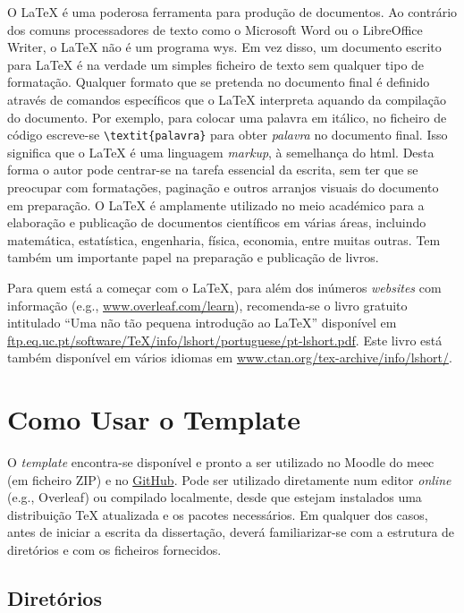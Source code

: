 O \LaTeX{} é uma poderosa ferramenta para produção de documentos. Ao contrário dos comuns processadores de texto como o Microsoft Word ou o LibreOffice Writer, o \LaTeX{} não é um programa \ac{wys}. Em vez disso, um documento escrito para \LaTeX{} é na verdade um simples ficheiro de texto sem qualquer tipo de formatação. Qualquer formato que se pretenda no documento final é definido através de comandos específicos que o \LaTeX{} interpreta aquando da compilação do documento. Por exemplo, para colocar uma palavra em itálico, no ficheiro de código escreve-se \verb|\textit{palavra}| para obter \textit{palavra} no documento final. Isso significa que o \LaTeX{} é uma linguagem \emph{markup}, à semelhança do \ac{html}. Desta forma o autor pode centrar-se na tarefa essencial da escrita, sem ter que se preocupar com formatações, paginação e outros arranjos visuais do documento em preparação. O \LaTeX{} é amplamente utilizado no meio académico para a elaboração e publicação de documentos científicos em várias áreas, incluindo matemática, estatística, engenharia, física, economia, entre muitas outras. Tem também um importante papel na preparação e publicação de livros.

Para quem está a começar com o \LaTeX{}, para além dos inúmeros \textit{websites} com informação (e.g., \url{www.overleaf.com/learn}), recomenda-se o livro gratuito intitulado ``Uma não tão pequena introdução ao \LaTeX{}'' disponível em \url{ftp.eq.uc.pt/software/TeX/info/lshort/portuguese/pt-lshort.pdf}. Este livro está também disponível em vários idiomas em \url{www.ctan.org/tex-archive/info/lshort/}.


\section{Como Usar o Template}
\label{sec:Ch2.2}

O \textit{template} encontra-se disponível e pronto a ser utilizado no Moodle do \ac{meec} (em ficheiro ZIP) e no \href{https://github.com/}{GitHub}. Pode ser utilizado diretamente num editor \textit{online} (e.g., Overleaf) ou compilado localmente, desde que estejam instalados uma distribuição \TeX{} atualizada e os pacotes necessários.
Em qualquer dos casos, antes de iniciar a escrita da dissertação, deverá familiarizar-se com a estrutura de diretórios e com os ficheiros fornecidos.

\subsection{Diretórios}

